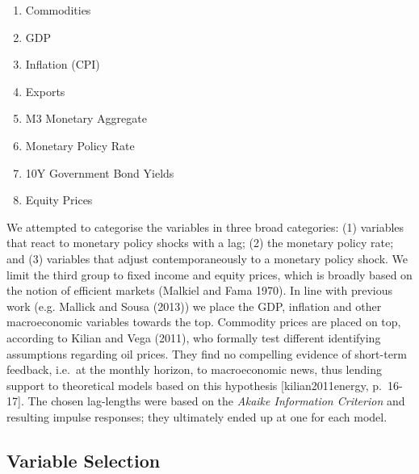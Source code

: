 \documentclass[12pt,]{article}
\providecommand{\tightlist}{%
  \setlength{\itemsep}{0pt}\setlength{\parskip}{0pt}}
\begin{document}
\begin{enumerate}
\def\labelenumi{\arabic{enumi}.}
\tightlist
\item
  Commodities
\item
  GDP
\item
  Inflation (CPI)
\item
  Exports
\item
  M3 Monetary Aggregate
\item
  Monetary Policy Rate
\item
  10Y Government Bond Yields
\item
  Equity Prices
\end{enumerate}

We attempted to categorise the variables in three broad categories: (1)
variables that react to monetary policy shocks with a lag; (2) the
monetary policy rate; and (3) variables that adjust contemporaneously to
a monetary policy shock. We limit the third group to fixed income and
equity prices, which is broadly based on the notion of efficient markets
(Malkiel and Fama 1970). In line with previous work (e.g. Mallick and
Sousa (2013)) we place the GDP, inflation and other macroeconomic
variables towards the top. Commodity prices are placed on top, according
to Kilian and Vega (2011), who formally test different identifying
assumptions regarding oil prices. They find no compelling evidence of
short-term feedback, i.e.~at the monthly horizon, to macroeconomic news,
thus lending support to theoretical models based on this hypothesis
{[}kilian2011energy, p.~16-17{]}. The chosen lag-lengths were based on
the \emph{Akaike Information Criterion} and resulting impulse responses;
they ultimately ended up at one for each model.

\subsection{Variable Selection}\label{variable-selection}
\end{document}
